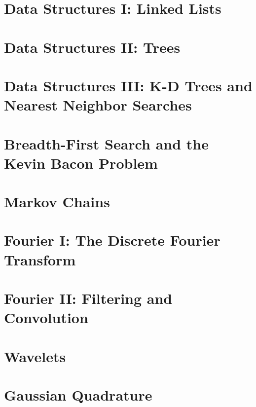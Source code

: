 
\section*{Data Structures I: Linked Lists} %

\section*{Data Structures II: Trees} %

\section*{Data Structures III: K-D Trees and Nearest Neighbor Searches} %

\section*{Breadth-First Search and the Kevin Bacon Problem} %

\section*{Markov Chains} %

\section*{Fourier I: The Discrete Fourier Transform} %

\section*{Fourier II: Filtering and Convolution} %

\section*{Wavelets} %

\section*{Gaussian Quadrature} %
